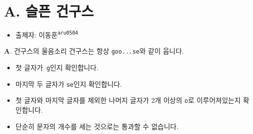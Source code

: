 \section{A. 슬픈 건구스}

\begin{frame} %
    \begin{itemize}
        \item 출제자: 이동훈\textsuperscript{\color{kupc-gray}\texttt{aru0504}}
    \end{itemize}
\end{frame}

\begin{frame}{\textbf{A}. 건구스의 울음소리}
   건구스는 항상 \texttt{goo...se}와 같이 웁니다.
    \begin{itemize}
        \item 첫 글자가\texttt{ \color{kupc-green}g}인지 확인합니다.
        \item 마지막 두 글자가  \texttt{\color{kupc-green}se}인지 확인합니다.
        \item 첫 글자와 마지막 글자를 제외한 나머지 글자가 2개 이상의 \texttt{\color{kupc-green}o}로 이루어져있는지 확인합니다.
	\item 단순히 문자의 개수를 세는 것으로는 통과할 수 없습니다.
    \end{itemize}

\end{frame}
